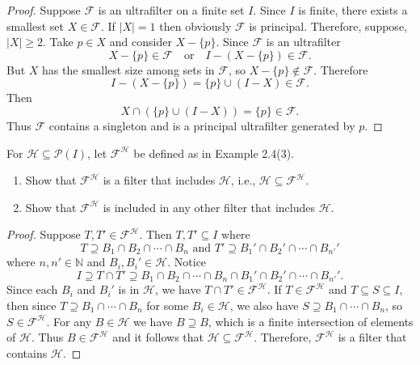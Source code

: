 \begin{proof}
    Suppose $\mathcal{F}$ is an ultrafilter on a finite set $I$.
    Since $I$ is finite, there exists a smallest set $X \in \mathcal{F}$.
    If $|X| = 1$ then obviously $\mathcal{F}$ is principal.
    Therefore, suppose, $|X| \ge 2$.
    Take $p \in X$ and consider $X - \{p\}$. 
    Since $\mathcal{F}$ is an ultrafilter
    \[
        X - \{p\} \in \mathcal{F} \quad \text{or} \quad I - (X - \{p\}) \in \mathcal{F}.
    \]
    But $X$ has the smallest size among sets in $\mathcal{F}$, so $X - \{p\} \notin \mathcal{F}$. 
    Therefore
    \[
        I - (X - \{p\}) = \{p\} \cup (I - X) \in \mathcal{F}.
    \]
    Then
    \[
        X \cap (\{p\} \cup (I - X)) = \{p\} \in \mathcal{F}.
    \]
    Thus $\mathcal{F}$ contains a singleton and is a principal ultrafilter generated by $p$.
\end{proof}

\begin{tcolorbox}[title=Problem 4, breakable]
    For $\mathcal{H} \subseteq \mathcal{P}(I)$, let $\mathcal{F}^{\mathcal{H}}$
    be defined as in Example 2.4(3).
    \begin{enumerate}
        \item Show that $\mathcal{F}^{\mathcal{H}}$ is a filter that includes 
        $\mathcal{H}$, i.e., $\mathcal{H} \subseteq \mathcal{F}^{\mathcal{H}}$.
        \item Show that $\mathcal{F}^{\mathcal{H}}$ is included in any other filter 
        that includes $\mathcal{H}$.
    \end{enumerate}
\end{tcolorbox}

\begin{proof}
    Suppose $T, T' \in \mathcal{F}^{\mathcal{H}}$.
    Then $T, T' \subseteq I$ where
    \[T \supseteq B_1 \cap B_2 \cap \cdots \cap B_n \text{ and } 
      T' \supseteq B_1' \cap B_2' \cap \cdots \cap B_{n'}' \]
    where $n, n' \in \mathbb{N}$ and $B_i, B_i' \in \mathcal{H}$.
    Notice
    \[
    I \supseteq T \cap T' \supseteq
    B_1 \cap B_2 \cap \cdots \cap B_n \cap
    B_1' \cap B_2' \cap \cdots \cap B_{n'}'.
    \]
    Since each $B_i$ and $B_i'$ is in $\mathcal{H}$,  we have $T \cap T' \in \mathcal{F}^{\mathcal{H}}$.
    If $T \in \mathcal{F}^{\mathcal{H}}$ and $T \subseteq S \subseteq I$,
    then since $T \supseteq B_1 \cap \cdots \cap B_n$ for some $B_i \in \mathcal{H}$,
    we also have $S \supseteq B_1 \cap \cdots \cap B_n$, so $S \in \mathcal{F}^{\mathcal{H}}$.
    For any $B \in \mathcal{H}$ we have $B \supseteq B$, which is a finite intersection of elements of $\mathcal{H}$.
    Thus $B \in \mathcal{F}^{\mathcal{H}}$ and it follows that $\mathcal{H} \subseteq \mathcal{F}^{\mathcal{H}}$.
    Therefore, $\mathcal{F}^{\mathcal{H}}$ is a filter that contains $\mathcal{H}$.
\end{proof}

